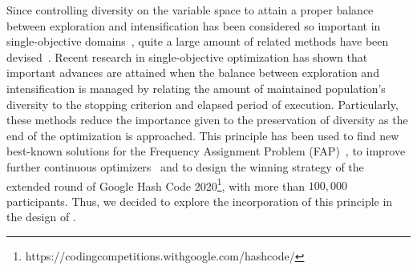 Since controlling diversity on the variable space to attain a proper balance between exploration and intensification has been considered 
so important in single-objective domains~\cite{lin2009auto},
quite a large amount of related methods have been devised~\cite{Joel:Crepinsek}. 
%
%
%
%
%
%
Recent research in single-objective optimization has shown that important advances are attained when the
balance between exploration and intensification is managed by relating the amount of maintained population's diversity to 
the stopping criterion and elapsed period of execution.
%
Particularly, these methods reduce the importance given to the preservation of diversity as the end of the optimization
is approached.
%
This principle has been used to find new best-known solutions for the Frequency Assignment Problem 
(FAP)~\cite{segura2016improving}, to improve further continuous optimizers~\cite{castillo2019differential} and
to design the winning strategy of the extended round of Google Hash Code 
2020\footnote{https://codingcompetitions.withgoogle.com/hashcode/}, with more than $100,000$ participants.
%
Thus, we decided to explore the incorporation of this principle in the design of \MOEAS{}.
%
%
%

